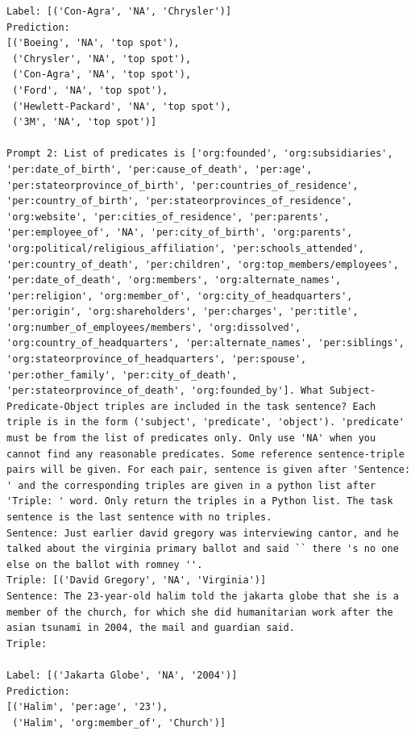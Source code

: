 \documentclass{article}
\begin{document}
\begin{lstlisting}
Label: [('Con-Agra', 'NA', 'Chrysler')]
Prediction: 
[('Boeing', 'NA', 'top spot'),
 ('Chrysler', 'NA', 'top spot'),
 ('Con-Agra', 'NA', 'top spot'),
 ('Ford', 'NA', 'top spot'),
 ('Hewlett-Packard', 'NA', 'top spot'),
 ('3M', 'NA', 'top spot')]

Prompt 2: List of predicates is ['org:founded', 'org:subsidiaries', 'per:date_of_birth', 'per:cause_of_death', 'per:age', 'per:stateorprovince_of_birth', 'per:countries_of_residence', 'per:country_of_birth', 'per:stateorprovinces_of_residence', 'org:website', 'per:cities_of_residence', 'per:parents', 'per:employee_of', 'NA', 'per:city_of_birth', 'org:parents', 'org:political/religious_affiliation', 'per:schools_attended', 'per:country_of_death', 'per:children', 'org:top_members/employees', 'per:date_of_death', 'org:members', 'org:alternate_names', 'per:religion', 'org:member_of', 'org:city_of_headquarters', 'per:origin', 'org:shareholders', 'per:charges', 'per:title', 'org:number_of_employees/members', 'org:dissolved', 'org:country_of_headquarters', 'per:alternate_names', 'per:siblings', 'org:stateorprovince_of_headquarters', 'per:spouse', 'per:other_family', 'per:city_of_death', 'per:stateorprovince_of_death', 'org:founded_by']. What Subject-Predicate-Object triples are included in the task sentence? Each triple is in the form ('subject', 'predicate', 'object'). 'predicate' must be from the list of predicates only. Only use 'NA' when you cannot find any reasonable predicates. Some reference sentence-triple pairs will be given. For each pair, sentence is given after 'Sentence: ' and the corresponding triples are given in a python list after 'Triple: ' word. Only return the triples in a Python list. The task sentence is the last sentence with no triples.
Sentence: Just earlier david gregory was interviewing cantor, and he talked about the virginia primary ballot and said `` there 's no one else on the ballot with romney ''. 
Triple: [('David Gregory', 'NA', 'Virginia')]
Sentence: The 23-year-old halim told the jakarta globe that she is a member of the church, for which she did humanitarian work after the asian tsunami in 2004, the mail and guardian said. 
Triple:

Label: [('Jakarta Globe', 'NA', '2004')]
Prediction: 
[('Halim', 'per:age', '23'),
 ('Halim', 'org:member_of', 'Church')]


\end{lstlisting}
\end{document}
